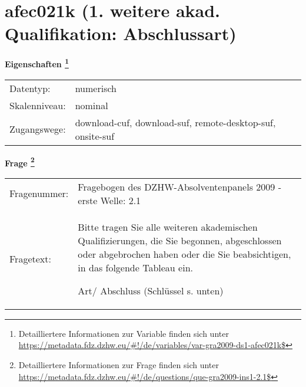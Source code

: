 
    \setcounter{footnote}{0}

    \vspace*{-1.8cm}
	\section{afec021k (1. weitere akad. Qualifikation: Abschlussart)}
	\label{section:afec021k}



    \vspace*{0.5cm}
    \noindent\textbf{Eigenschaften
	\footnote{Detailliertere Informationen zur Variable finden sich unter
		\url{https://metadata.fdz.dzhw.eu/\#!/de/variables/var-gra2009-ds1-afec021k$}}}\\
	\begin{tabularx}{\hsize}{@{}lX}
	Datentyp: & numerisch \\
	Skalenniveau: & nominal \\
	Zugangswege: &
	  download-cuf, 
	  download-suf, 
	  remote-desktop-suf, 
	  onsite-suf
 \\
    \end{tabularx}



				\vspace*{0.5cm}
                \noindent\textbf{Frage
	                \footnote{Detailliertere Informationen zur Frage finden sich unter
		              \url{https://metadata.fdz.dzhw.eu/\#!/de/questions/que-gra2009-ins1-2.1$}}}\\
				\begin{tabularx}{\hsize}{@{}lX}
					Fragenummer: &
					  Fragebogen des DZHW-Absolventenpanels 2009 - erste Welle:
					  2.1
 \\
					Fragetext: & Bitte tragen Sie alle weiteren akademischen Qualifizierungen, die Sie begonnen, abgeschlossen oder abgebrochen haben oder die Sie beabsichtigen, in das folgende Tableau ein.\par  Art/ Abschluss (Schlüssel s. unten) \\
				\end{tabularx}





